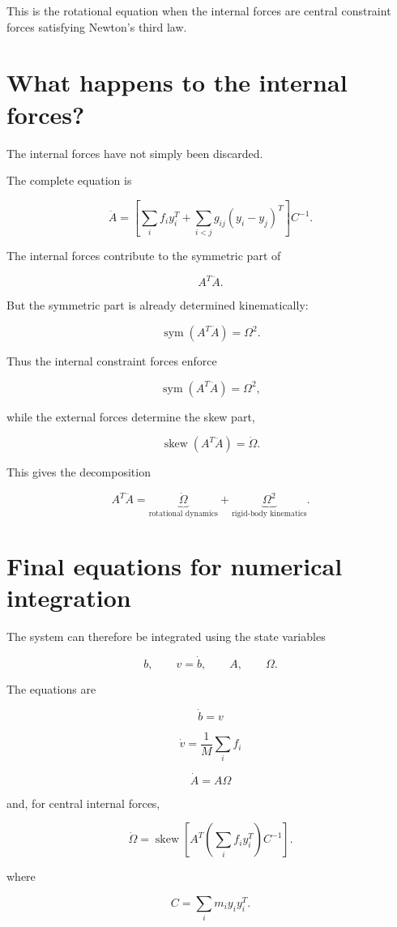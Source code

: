 \documentclass{article}
\begin{document}
This is the rotational equation when the internal forces are central constraint forces satisfying Newton's third law.

\section{What happens to the internal forces?}

The internal forces have not simply been discarded.

The complete equation is

\[
\ddot A = \left[ \sum_i f_i y_i^T + \sum_{i<j}g_{ij}(y_i-y_j)^T \right]C^{-1}.
\]

The internal forces contribute to the symmetric part of

\[
A^T\ddot A.
\]

But the symmetric part is already determined kinematically:

\[
\operatorname{sym}(A^T\ddot A)=\Omega^2.
\]

Thus the internal constraint forces enforce

\[
\operatorname{sym}(A^T\ddot A)=\Omega^2,
\]

while the external forces determine the skew part,

\[
\operatorname{skew}(A^T\ddot A)=\dot\Omega.
\]

This gives the decomposition

\[
A^T\ddot A = \underbrace{\dot\Omega}_{\text{rotational dynamics}} + \underbrace{\Omega^2}_{\text{rigid-body kinematics}}.
\]

\section{Final equations for numerical integration}

The system can therefore be integrated using the state variables

\[
b,\qquad v=\dot b,\qquad A,\qquad \Omega.
\]

The equations are

\[
\dot b=v
\]

\[
\dot v = \frac{1}{M}\sum_i f_i
\]

\[
\dot A=A\Omega
\]

and, for central internal forces,

\[
\dot\Omega = \operatorname{skew} \left[ A^T \left( \sum_i f_i y_i^T \right) C^{-1} \right].
\]

where

\[
C=\sum_i m_i y_i y_i^T.
\]
\end{document}
